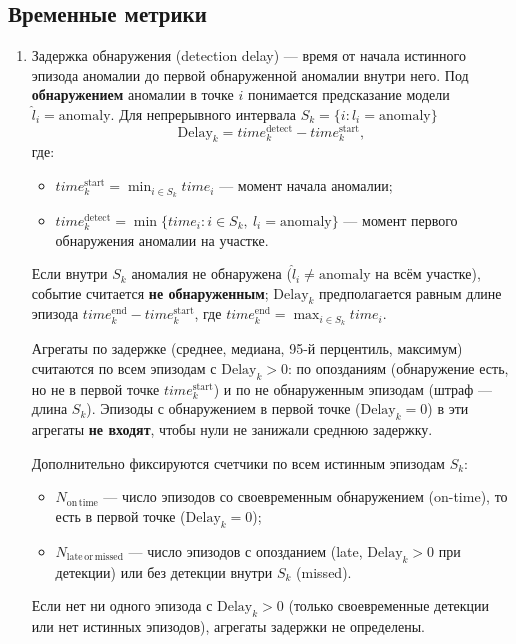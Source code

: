 \documentclass[a4paper,12pt]{report}
\begin{document}
	\subsection{Временные метрики}
	\begin{enumerate}
		\item Задержка обнаружения (detection delay) --- время от начала истинного эпизода аномалии до первой обнаруженной аномалии внутри него. Под \textbf{обнаружением} аномалии в точке $i$ понимается предсказание модели $\hat{l}_i = \mathrm{anomaly}$. Для непрерывного интервала $S_k=\{i : l_i = \mathrm{anomaly}\}$
		\[
		\mathrm{Delay}_k=time_k^{\mathrm{detect}}-time_k^{\mathrm{start}},
		\]
		где:
		\begin{itemize}
			\item $time_k^{\mathrm{start}}=\min_{i\in S_k} time_i$ --- момент начала аномалии;
			\item $time_k^{\mathrm{detect}}=\min\{time_i : i\in S_k,\ \hat{l}_i = \mathrm{anomaly}\}$ --- момент первого обнаружения аномалии на участке.
		\end{itemize}
		Если внутри $S_k$ аномалия не обнаружена ($\hat{l}_i \neq \mathrm{anomaly}$ на всём участке), событие считается \textbf{не обнаруженным}; $\mathrm{Delay}_k$ предполагается равным длине эпизода $time_k^{\mathrm{end}}-time_k^{\mathrm{start}}$, где $time_k^{\mathrm{end}}=\max_{i\in S_k} time_i$.

		Агрегаты по задержке (среднее, медиана, 95-й перцентиль, максимум) считаются по всем эпизодам с $\mathrm{Delay}_k > 0$: по опозданиям (обнаружение есть, но не в первой точке $time_k^{\mathrm{start}}$) и по не обнаруженным эпизодам (штраф --- длина $S_k$). Эпизоды с обнаружением в первой точке ($\mathrm{Delay}_k = 0$) в эти агрегаты \textbf{не входят}, чтобы нули не занижали среднюю задержку.

		Дополнительно фиксируются счетчики по всем истинным эпизодам $S_k$:
		\begin{itemize}
			\item $N_{\mathrm{on\,time}}$ --- число эпизодов со своевременным обнаружением (on-time), то есть в первой точке ($\mathrm{Delay}_k = 0$);
			\item $N_{\mathrm{late\,or\,missed}}$ --- число эпизодов с опозданием (late, $\mathrm{Delay}_k > 0$ при детекции) или без детекции внутри $S_k$ (missed).
		\end{itemize}
		Если нет ни одного эпизода с $\mathrm{Delay}_k > 0$ (только своевременные детекции или нет истинных эпизодов), агрегаты задержки не определены.
	\end{enumerate}
\end{document}
